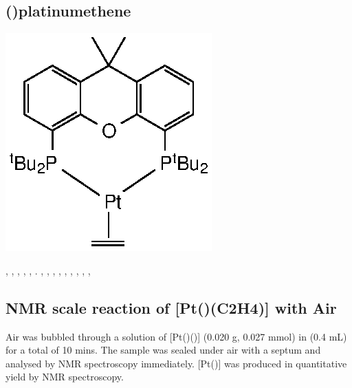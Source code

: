 \subsection*{(\tBuXantphos)platinumethene}
\begin{structure}[h]
\begin{center}
\includegraphics{../Structures/CtBuPtethene.eps}
\end{center}
\end{structure}

,
,
,
,
,
.
,
,
,
,
,
,
,
,
,

\subsection*{NMR scale reaction of [Pt(\tButhixantphos)(C2H4)] with Air}
Air was bubbled through a solution of [Pt(\tButhixantphos)()] (0.020 g, 0.027 mmol) in  (0.4 mL) for a total of 10 mins.  The sample was sealed under air with a septum and analysed by NMR spectroscopy immediately.  [Pt(\tButhixantphos)] was produced in quantitative yield by NMR spectroscopy.  

